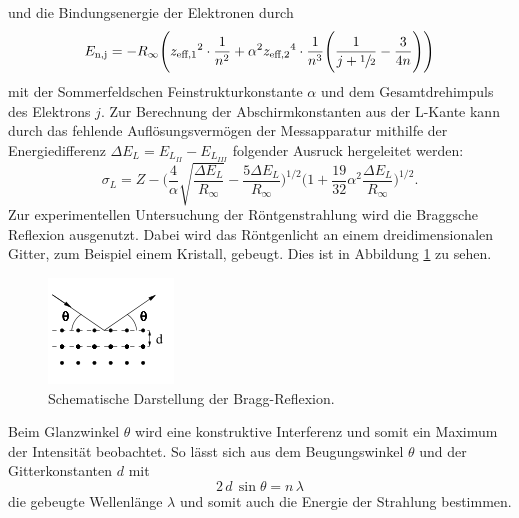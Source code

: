 und die Bindungsenergie der Elektronen durch
\begin{equation}
  E_\text{n,j} = - R_{\infty} \Biggl({z_\text{eff,1}}^2 \cdot \frac{1}{n^2} + {\alpha}^2 {z_\text{eff,2}}^4 \cdot \frac{1}{n^3} \Biggl(\frac{1}{j+\sfrac{1}{2}} - \frac{3}{4n} \Biggr) \Biggr)
  \label{eqn:feinstruktur}
\end{equation}
mit der Sommerfeldschen Feinstrukturkonstante $\alpha$ und dem Gesamtdrehimpuls des Elektrons $j$.
Zur Berechnung der Abschirmkonstanten aus der L-Kante kann durch das fehlende Auflösungsvermögen der Messapparatur mithilfe der Energiedifferenz $\Delta E_L = E_{L_{II}}- E_{L_{III}}$ folgender
Ausruck hergeleitet werden:
\begin{equation}
{\sigma}_L = Z - \Biggl(\frac{4}{\alpha} \sqrt{\frac{\Delta E_L}{R_{\infty}}} - \frac{5 \Delta E_L}{R_{\infty}} \Biggr)^{1/2} \Biggl(1+ \frac{19}{32} {\alpha}^2 \frac{\Delta E_L}{R_{\infty}} \Biggr)^{1/2} .
\label{eqn:sigmaL}
\end{equation}
Zur experimentellen Untersuchung der Röntgenstrahlung wird die Braggsche Reflexion ausgenutzt. Dabei wird das Röntgenlicht an einem dreidimensionalen Gitter, zum Beispiel einem Kristall, gebeugt.
Dies ist in Abbildung \ref{fig:braggreflexion} zu sehen.
\begin{figure}
  \centering
  \includegraphics{images/bragg.png}
  \caption{Schematische Darstellung der Bragg-Reflexion.\cite{sample}}
  \label{fig:braggreflexion}
\end{figure}
Beim Glanzwinkel $\theta$ wird eine konstruktive Interferenz und somit ein Maximum der Intensität beobachtet. So lässt sich aus dem Beugungswinkel $\theta$ und der Gitterkonstanten $d$ mit
\begin{equation}
  2 \, d \, \sin{\theta} = n \, \lambda
  \label{eqn:bragg}
\end{equation}
die gebeugte Wellenlänge $\lambda$ und somit auch die Energie der Strahlung bestimmen.
